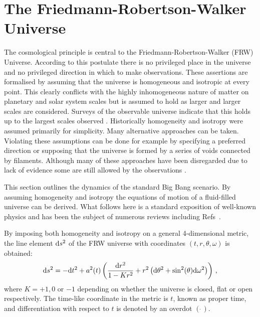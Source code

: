 \section{The Friedmann-Robertson-Walker Universe}
\label{sec:frw-intro}
The cosmological principle is central to the Friedmann-Robertson-Walker
(FRW\footnotemark) Universe. 
According to this postulate there is no privileged
place in the universe and no privileged direction in which to make observations.
These assertions
are formalised by assuming that the universe is homogeneous and isotropic at
every point. This clearly conflicts with the highly inhomogeneous nature of matter
on planetary and solar system scales but is assumed to hold as larger and larger
scales are considered.
Surveys of the observable universe indicate that this holds up to the largest
scales observed \cite{Colless:2001gk, York:2000gk}. 
Historically homogeneity and isotropy were assumed primarily for simplicity.
Many alternative approaches can be taken. Violating these assumptions can
be done for example by specifying a preferred direction or supposing that the
universe is formed by a series of voids connected by filaments. Although many
of these approaches have been disregarded due to lack of evidence some are still
allowed by the observations
\cite{GarciaBellido:2008nz,Alexander:2007xx,Alnes:2005rw,Hunt:2008wp}.

This section outlines the dynamics of the standard Big Bang scenario.
By assuming homogeneity and isotropy the equations of motion of a
fluid-filled universe can be derived. What follows here is a
standard exposition of well-known physics and has been the subject of
numerous reviews including Refs~\cite{book:kolbturner, book:kip, book:liddle}.


By imposing both homogeneity and isotropy on a general 4-dimensional metric, the
line element $\mathrm{d} s^2$ of the FRW universe with coordinates $(t,r,\theta,\omega)$
is obtained:
% 
\begin{equation}
 \label{eq:frwmetric-intro}
\mathrm{d} s^2 = -\mathrm{d} t^2 + a^2(t)
  \left( 
    \frac{\mathrm{d} r^2}{1-Kr^2} + r^2\left(\mathrm{d}\theta^2 + \sin^2(\theta)
\mathrm{d}\omega^2\right)
  \right)\,,
\end{equation}
% 
where $K=+1, 0$ or $-1$ depending on whether the universe is closed, flat
or open respectively. The time-like coordinate in the metric is $t$, known as
proper time, and differentiation with respect to $t$ is denoted by an
overdot $(\dot{~})$. 


